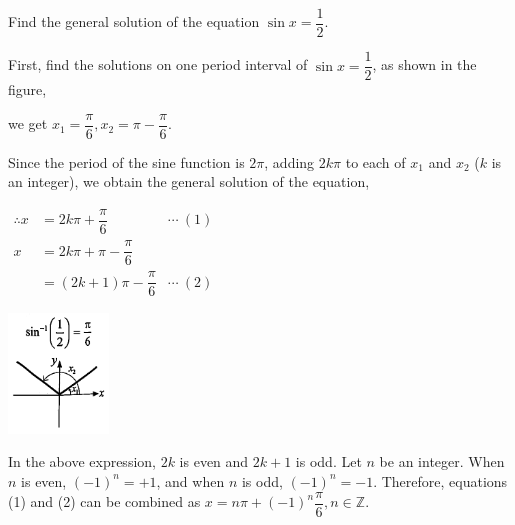 \documentclass{report}
\begin{document}
\begin{question}
	Find the general solution of the equation $\sin x=\dfrac{1}{2}$.
	
	\sol{}
	
	\begin{vwcol}[widths={0.6,0.4}, sep=0.8cm, justify=flush,rule=0pt]
		\noindent First, find the solutions on one period interval of $\sin x=\dfrac{1}{2}$, as shown in the figure, 
		    
		\noindent we get $x_1=\dfrac{\pi}{6}, x_2=\pi-\dfrac{\pi}{6}$.
		
		\noindent Since the period of the sine function is $2\pi$, adding $2k\pi$ to each of $x_1$ and $x_2$ ($k$ is an integer), we obtain the general solution of the equation,
		
		\vspace{0.5em}
		\noindent $\begin{aligned} \therefore x & =2 k \pi+\dfrac{\pi}{6} &\cdots\ (1) \\ x & =2 k \pi+\pi-\dfrac{\pi}{6} \\ & =(2 k+1) \pi-\dfrac{\pi}{6}&\cdots\ (2)\end{aligned}$
		
		\includegraphics[width=0.2\textwidth]{assets/11-9.jpg}
	\end{vwcol}
\end{question}

In the above expression, $2k$ is even and $2k+1$ is odd. Let $n$ be an integer. When $n$ is even, $(-1)^n=+1$, and when $n$ is odd, $(-1)^n=-1$. Therefore, equations (1) and (2) can be combined as $x=n\pi+(-1)^n\dfrac{\pi}{6}, n \in \mathbb{Z}$.
\end{document}
